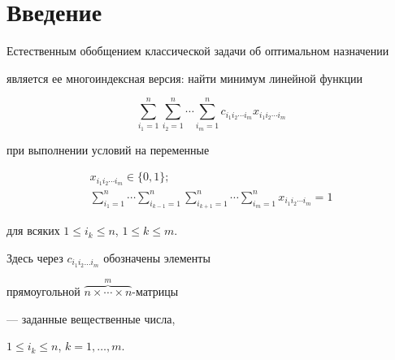

\maketitle


\label{begin}





\section{Введение}





Естественным обобщением классической задачи об оптимальном назначении


является ее многоиндексная версия: найти минимум линейной функции


\begin{equation}


\label{a1}


\sum_{i_1 = 1}^{n} \sum_{ i_2 = 1}^{n} \dotsb \sum_{ i_m = 1}^{n}


c_{i_1 i_2 \dotsb i_m} x_{i_1 i_2 \dotsb i_m}


\end{equation}


при выполнении условий на переменные


\begin{gather}


\label{a2}


x_{i_1 i_2 \dotsb i_m}\in \{0, 1\}; \\


%


\label{a3}


\sum_{i_1 = 1}^{n} \dotsb


\sum_{i_{k-1} = 1}^{n} \sum_{ i_{k+1} = 1}^{n} \dotsb \sum_{ i_m = 1}^{n}


x_{i_1 i_2 \dotsb i_m} =1


\end{gather}


для всяких $ 1\le i_k \le n$, $1\le k\le m$.


Здесь через $ c_{i_1 i_2 \dotsc i_m} $ обозначены элементы


прямоугольной $\overbrace{n \times \dotsb \times n}^{m}$-матрицы


--- заданные вещественные числа,


$1 \le i_k \le n$, $k=1, \dotsc, m$.





